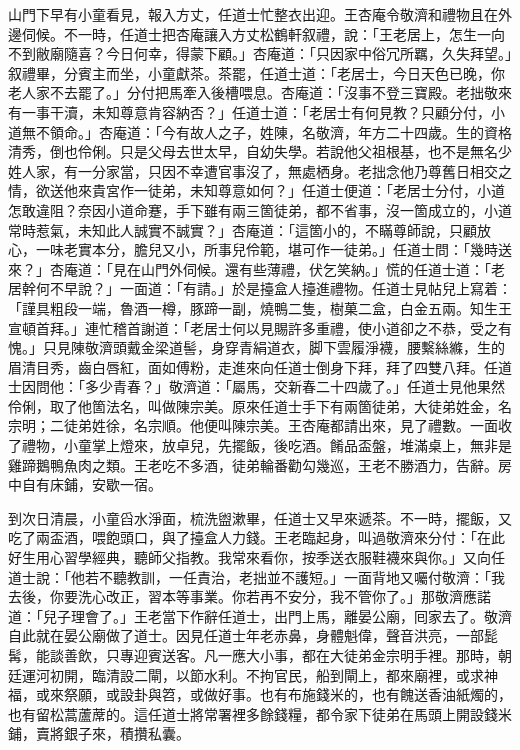 山門下早有小童看見，報入方丈，任道士忙整衣出迎。王杏庵令敬濟和禮物且在外邊伺候。不一時，任道士把杏庵讓入方丈松鶴軒叙禮，說：「王老居上，怎生一向不到敝廟隨喜？今日何幸，得蒙下顧。」杏庵道：「只因家中俗冗所羈，久失拜望。」叙禮畢，分賓主而坐，小童獻茶。茶罷，任道士道：「老居士，今日天色已晚，你老人家不去罷了。」分付把馬牽入後槽喂息。杏庵道：「沒事不登三寶殿。老拙敬來有一事干瀆，未知尊意肯容納否？」任道士道：「老居士有何見教？只顧分付，小道無不領命。」杏庵道：「今有故人之子，姓陳，名敬濟，年方二十四歲。生的資格清秀，倒也伶俐。只是父母去世太早，自幼失學。若說他父祖根基，也不是無名少姓人家，有一分家當，只因不幸遭官事沒了，無處栖身。老拙念他乃尊舊日相交之情，欲送他來貴宮作一徒弟，未知尊意如何？」任道士便道：「老居士分付，小道怎敢違阻？奈因小道命蹇，手下雖有兩三箇徒弟，都不省事，沒一箇成立的，小道常時惹氣，未知此人誠實不誠實？」杏庵道：「這箇小的，不瞞尊師說，只顧放心，一味老實本分，膽兒又小，{}所事兒伶範，堪可作一徒弟。」{}任道士問：「幾時送來？」杏庵道：「見在山門外伺候。還有些薄禮，伏乞笑納。」慌的任道士道：「老居幹何不早說？」一面道：「有請。」於是擡盒人擡進禮物。任道士見帖兒上寫着：「謹具粗段一端，魯酒一樽，豚蹄一副，燒鴨二隻，樹菓二盒，白金五兩。知生王宣頓首拜。」連忙稽首謝道：「老居士何以見賜許多重禮，使小道卻之不恭，受之有愧。」只見陳敬濟頭戴金梁道髻，身穿青絹道衣，脚下雲履淨襪，腰繫絲縧，生的眉清目秀，齒白唇紅，面如傅粉，走進來向任道士倒身下拜，拜了四雙八拜。任道士因問他：「多少青春？」敬濟道：「屬馬，交新春二十四歲了。」任道士見他果然伶俐，取了他箇法名，叫做陳宗美。原來任道士手下有兩箇徒弟，大徒弟姓金，名宗明；二徒弟姓徐，名宗順。他便叫陳宗美。王杏庵都請出來，見了禮數。一面收了禮物，小童掌上燈來，放卓兒，先擺飯，後吃酒。餚品盃盤，堆滿桌上，無非是雞蹄鵝鴨魚肉之類。王老吃不多酒，徒弟輪番勸勾幾巡，王老不勝酒力，告辭。房中自有床鋪，安歇一宿。

到次日清晨，小童舀水淨面，梳洗盥漱畢，任道士又早來遞茶。不一時，擺飯，又吃了兩盃酒，喂飽頭口，與了擡盒人力錢。王老臨起身，叫過敬濟來分付：「在此好生用心習學經典，聽師父指教。我常來看你，按季送衣服鞋襪來與你。」又向任道士說：「他若不聽教訓，一任責治，老拙並不護短。」一面背地又囑付敬濟：「我去後，你要洗心改正，習本等事業。你若再不安分，我不管你了。」{}那敬濟應諾道：「兒子理會了。」王老當下作辭任道士，出門上馬，離晏公廟，囘家去了。敬濟自此就在晏公廟做了道士。因見任道士年老赤鼻，身體魁偉，聲音洪亮，一部髭髯，能談善飲，只專迎賓送客。凡一應大小事，都在大徒弟金宗明手裡。那時，朝廷運河初開，臨清設二閘，以節水利。不拘官民，船到閘上，都來廟裡，或求神福，或來祭願，或設卦與笤，或做好事。也有布施錢米的，也有餽送香油紙燭的，也有留松蒿蘆蓆的。這任道士將常署裡多餘錢糧，都令家下徒弟在馬頭上開設錢米鋪，賣將銀子來，積攢私囊。

